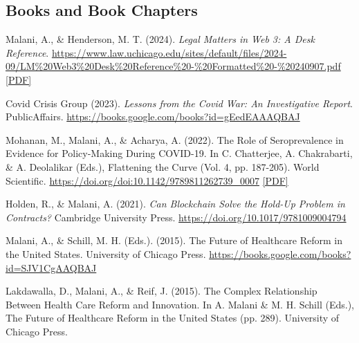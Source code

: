     \subsection*{Books and Book Chapters}

    \begin{tablist}

        \item[2024] \tab{}Malani, A., \& Henderson, M. T. (2024). \textit{Legal Matters in Web 3: A Desk Reference}. \href{https://www.law.uchicago.edu/sites/default/files/2024-09/LM%20Web3%20Desk%20Reference%20-%20Formatted%20-%20240907.pdf}{https://www.law.uchicago.edu/sites/default/files/2024-09/LM\%20Web3\%20Desk\%20Reference\%20-\%20Formatted\%20-\%20240907.pdf} \href{https://github.com/anup-malani/website_personal/blob/main/publications/2024_Malani_Web3DeskReference.pdf}{[PDF]}
    
        \item[2023] \tab{}Covid Crisis Group (2023). \textit{Lessons from the Covid War: An Investigative Report}. PublicAffairs. \href{https://books.google.com/books?id=gEedEAAAQBAJ}{https://books.google.com/books?id=gEedEAAAQBAJ} 

        \item[2023] \tab{}Mohanan, M., Malani, A., \& Acharya, A. (2022). The Role of Seroprevalence in Evidence for Policy-Making During COVID-19. In C. Chatterjee, A. Chakrabarti, \& A. Deolalikar (Eds.), Flattening the Curve (Vol. 4, pp. 187-205). World Scientific. \href{https://doi.org/doi:10.1142/9789811262739_0007}{https://doi.org/doi:10.1142/9789811262739\_0007} \href{https://github.com/anup-malani/website_personal/blob/main/publications/2023_MohananMalani_FlatteningCurveBook.pdf}{[PDF]}

        \item[2021] \tab{}Holden, R., \& Malani, A. (2021). \textit{Can Blockchain Solve the Hold-Up Problem in Contracts?} Cambridge University Press. \href{https://doi.org/10.1017/9781009004794}{https://doi.org/10.1017/9781009004794}

        \item[2015] \tab{}Malani, A., \& Schill, M. H. (Eds.). (2015). The Future of Healthcare Reform in the United States. University of Chicago Press. \href{https://books.google.com/books?id=SJV1CgAAQBAJ}{https://books.google.com/books?id=SJV1CgAAQBAJ}  

        \item[2015] \tab{}Lakdawalla, D., Malani, A., \& Reif, J. (2015). The Complex Relationship Between Health Care Reform and Innovation. In A. Malani & M. H. Schill (Eds.), The Future of Healthcare Reform in the United States (pp. 289). University of Chicago Press. 


\end{tablist}

